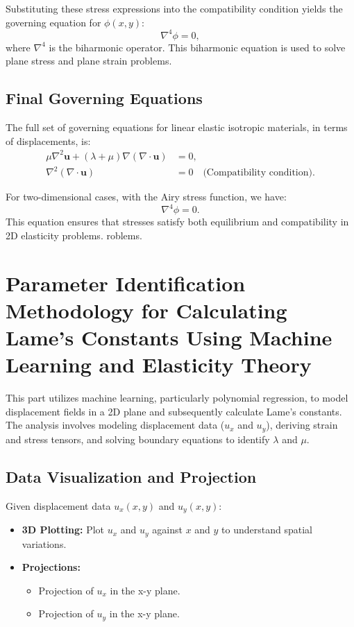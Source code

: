 \documentclass[fleqn,10pt]{olplainarticle}
\begin{document}
Substituting these stress expressions into the compatibility condition yields the governing equation for \(\phi(x, y)\):
\begin{equation}
\nabla^4 \phi = 0,
\end{equation}
where \(\nabla^4\) is the biharmonic operator. This biharmonic equation is used to solve plane stress and plane strain problems.


\subsection{Final Governing Equations}
The full set of governing equations for linear elastic isotropic materials, in terms of displacements, is:
\begin{align}
\mu \nabla^2 \mathbf{u} + (\lambda + \mu) \nabla (\nabla \cdot \mathbf{u}) &= 0, \\
\nabla^2 (\nabla \cdot \mathbf{u}) &= 0 \quad \text{(Compatibility condition)}.
\end{align}

For two-dimensional cases, with the Airy stress function, we have:
\begin{equation}
\nabla^4 \phi = 0.
\end{equation}
This equation ensures that stresses satisfy both equilibrium and compatibility in 2D elasticity problems.
roblems.

\section{Parameter Identification Methodology for Calculating Lame's Constants Using Machine Learning and Elasticity Theory}

This part utilizes machine learning, particularly polynomial regression, to model displacement fields in a 2D plane and subsequently calculate Lame's constants. The analysis involves modeling displacement data (\( u_x \) and \( u_y \)), deriving strain and stress tensors, and solving boundary equations to identify \( \lambda \) and \( \mu \).

\subsection{Data Visualization and Projection}
Given displacement data \( u_x(x, y) \) and \( u_y(x, y) \):
\begin{itemize}
    \item \textbf{3D Plotting:} Plot \( u_x \) and \( u_y \) against \( x \) and \( y \) to understand spatial variations.
    \item \textbf{Projections:}
    \begin{itemize}
        \item Projection of \( u_x \) in the x-y plane.
        \item Projection of \( u_y \) in the x-y plane.
    \end{itemize}
\end{itemize}
\end{document}

